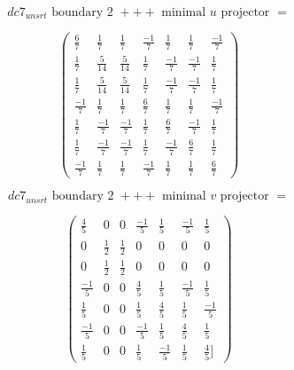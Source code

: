 \documentclass[preprint]{iucr}              %
\begin{document}
{\begin{itemize}
{\[dc7_{unsrt} \text{ boundary 2 } +++ \text{ minimal }u \text{ projector } =\]
\begin{center}
\begin{equation*}
\begin{pmatrix}
\frac{6}{7}&\frac{1}{7}&\frac{1}{7}&\frac{-1}{7}&\frac{1}{7}&\frac{1}{7}&\frac{-1}{7}\\[.25em]
\frac{1}{7}&\frac{5}{14}&\frac{5}{14}&\frac{1}{7}&\frac{-1}{7}&\frac{-1}{7}&\frac{1}{7}\\[.25em]
\frac{1}{7}&\frac{5}{14}&\frac{5}{14}&\frac{1}{7}&\frac{-1}{7}&\frac{-1}{7}&\frac{1}{7}\\[.25em]
\frac{-1}{7}&\frac{1}{7}&\frac{1}{7}&\frac{6}{7}&\frac{1}{7}&\frac{1}{7}&\frac{-1}{7}\\[.25em]
\frac{1}{7}&\frac{-1}{7}&\frac{-1}{7}&\frac{1}{7}&\frac{6}{7}&\frac{-1}{7}&\frac{1}{7}\\[.25em]
\frac{1}{7}&\frac{-1}{7}&\frac{-1}{7}&\frac{1}{7}&\frac{-1}{7}&\frac{6}{7}&\frac{1}{7}\\[.25em]
\frac{-1}{7}&\frac{1}{7}&\frac{1}{7}&\frac{-1}{7}&\frac{1}{7}&\frac{1}{7}&\frac{6}{7}
\end{pmatrix}
\end{equation*}
\end{center}


\[dc7_{unsrt} \text{ boundary 2 } +++ \text{ minimal }v \text{ projector } =\]
\begin{center}
\begin{equation*}
\begin{pmatrix}
\frac{4}{5}&0&0&\frac{-1}{5}&\frac{1}{5}&\frac{-1}{5}&\frac{1}{5}\\[.25em]
0&\frac{1}{2}&\frac{1}{2}&0&0&0&0\\[.25em]
0&\frac{1}{2}&\frac{1}{2}&0&0&0&0\\[.25em]
\frac{-1}{5}&0&0&\frac{4}{5}&\frac{1}{5}&\frac{-1}{5}&\frac{1}{5}\\[.25em]
\frac{1}{5}&0&0&\frac{1}{5}&\frac{4}{5}&\frac{1}{5}&\frac{-1}{5}\\[.25em]
\frac{-1}{5}&0&0&\frac{-1}{5}&\frac{1}{5}&\frac{4}{5}&\frac{1}{5}\\[.25em]
\frac{1}{5}&0&0&\frac{1}{5}&\frac{-1}{5}&\frac{1}{5}&\frac{4}{5}]
\end{pmatrix}
\end{equation*}
\end{center}



}
\end{itemize}}
\end{document}
